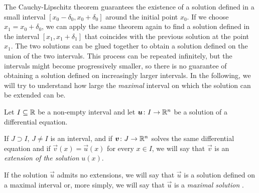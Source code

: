 The Cauchy-Lipschitz theorem guarantees the existence of a solution defined in a
small interval $[x_0-\delta_0, x_0+\delta_0]$ around the initial point $x_0$. If
we choose $x_1 = x_0+\delta_0$, we can apply the same theorem again to find a
solution defined in the interval $[x_1, x_1+\delta_1]$ that coincides with the
previous solution at the point $x_1$. The two solutions can be glued together to
obtain a solution defined on the union of the two intervals. This process can be
repeated infinitely, but the intervals might become progressively smaller, so
there is no guarantee of obtaining a solution defined on increasingly larger
intervals. In the following, we will try to understand how large the
\emph{maximal} interval on which the solution can be extended can be.

\begin{definition}
Let $I\subseteq {\mathbb R}$ be a non-empty interval and let $\boldsymbol u \colon I \to {\mathbb R}^n$
be a solution of a differential equation.

If $J\supset I$, $J \neq I$ is an interval, and if $\boldsymbol v\colon J \to {\mathbb R}^n$
solves the same differential equation and if $\vec v(x)=\vec u(x)$ for every
$x\in I$, we will say that $\vec v$ is an \emph{extension of the solution}%
 $u(x)$.

If the solution $\vec u$ admits no extensions, we will say that $\vec u$ is a
solution defined on a maximal interval or, more simply, we will say that $\vec
u$ is a \emph{maximal solution}%
.
\end{definition}

